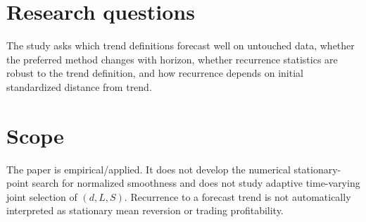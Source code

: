 \documentclass[11pt]{article}
\begin{document}
\section{Research questions}

The study asks which trend definitions forecast well on untouched data,
whether the preferred method changes with horizon, whether recurrence
statistics are robust to the trend definition, and how recurrence depends on
initial standardized distance from trend.

\section{Scope}

The paper is empirical/applied. It does not develop the numerical
stationary-point search for normalized smoothness and does not study adaptive
time-varying joint selection of $(d,L,S)$. Recurrence to a forecast trend is not
automatically interpreted as stationary mean reversion or trading
profitability.


\end{document}
